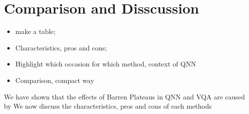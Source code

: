 \section{Comparison and Disscussion}
\begin{itemize}
    \item make a table;
    \item Characteristics, pros and cons;
    \item Highlight which occasion for which method, context of QNN
    \item Comparison, compact way
\end{itemize}

We have shown that the effects of Barren Plateaus in QNN and VQA are caused by 
We now discuss the characteristics, pros and cons of each methods